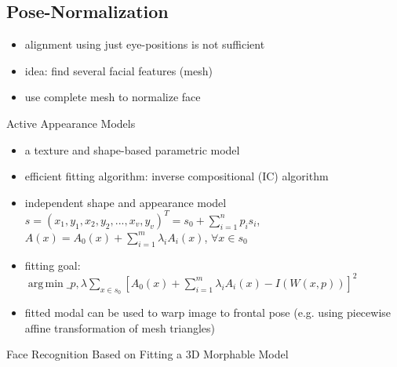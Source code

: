 \documentclass[paper=a4, fontsize=11pt]{scrartcl} %
\numberwithin{equation}{section} %
\numberwithin{figure}{section} %
\numberwithin{table}{section} %
\DeclareMathOperator*{\argmin}{arg\,min}
\begin{document}
\subsection{Pose-Normalization}

\begin{itemize}
\item alignment using just eye-positions is not sufficient
\item idea: find several facial features (mesh)
\item use complete mesh to normalize face
\end{itemize}

Active Appearance Models
\begin{itemize}
\item a texture and shape-based parametric model
\item efficient fitting algorithm: inverse compositional (IC) algorithm
\item independent shape and appearance model $s = (x_1,y_1,x_2,y_2,...,x_v,y_v)^T = s_0 + \sum\limits_{i=1}^n p_i s_i$, $A(x) = A_0(x) + \sum\limits_{i=1}^m \lambda_i A_i(x)$, $\forall x \in s_0$
\item fitting goal: $\argmin\limits\_{p,\lambda} \sum\limits_{x \in s_0} [A_0(x) + \sum\limits_{i=1}^m \lambda_i A_i(x) - I(W(x,p))]^2$
\item fitted modal can be used to warp image to frontal pose (e.g. using piecewise affine transformation of mesh triangles)
\end{itemize}

Face Recognition Based on Fitting a 3D Morphable Model
\end{document}
